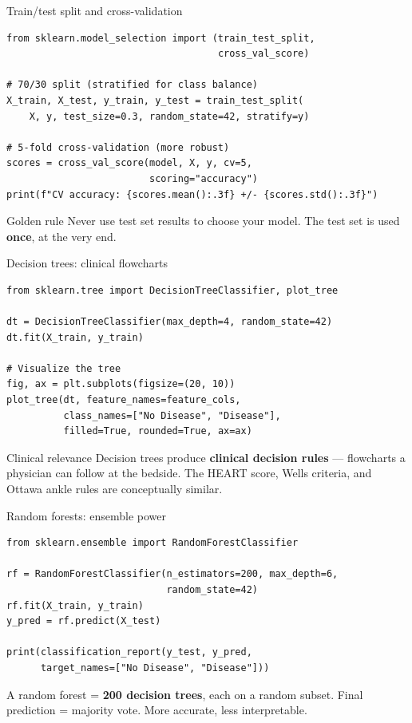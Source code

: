 \documentclass[aspectratio=169,11pt]{beamer}
\begin{document}
\begin{frame}[fragile]{Train/test split and cross-validation}
\begin{verbatim}
from sklearn.model_selection import (train_test_split,
                                     cross_val_score)

# 70/30 split (stratified for class balance)
X_train, X_test, y_train, y_test = train_test_split(
    X, y, test_size=0.3, random_state=42, stratify=y)

# 5-fold cross-validation (more robust)
scores = cross_val_score(model, X, y, cv=5,
                         scoring="accuracy")
print(f"CV accuracy: {scores.mean():.3f} +/- {scores.std():.3f}")
\end{verbatim}

\begin{alertblock}{Golden rule}
\alert{Never} use test set results to choose your model. The test set is used \textbf{once}, at the very end.
\end{alertblock}
\end{frame}

\begin{frame}[fragile]{Decision trees: clinical flowcharts}
\begin{verbatim}
from sklearn.tree import DecisionTreeClassifier, plot_tree

dt = DecisionTreeClassifier(max_depth=4, random_state=42)
dt.fit(X_train, y_train)

# Visualize the tree
fig, ax = plt.subplots(figsize=(20, 10))
plot_tree(dt, feature_names=feature_cols,
          class_names=["No Disease", "Disease"],
          filled=True, rounded=True, ax=ax)
\end{verbatim}

\begin{exampleblock}{Clinical relevance}
Decision trees produce \textbf{clinical decision rules} --- flowcharts a physician can follow at the bedside. The HEART score, Wells criteria, and Ottawa ankle rules are conceptually similar.
\end{exampleblock}
\end{frame}

\begin{frame}[fragile]{Random forests: ensemble power}
\begin{verbatim}
from sklearn.ensemble import RandomForestClassifier

rf = RandomForestClassifier(n_estimators=200, max_depth=6,
                            random_state=42)
rf.fit(X_train, y_train)
y_pred = rf.predict(X_test)

print(classification_report(y_test, y_pred,
      target_names=["No Disease", "Disease"]))
\end{verbatim}

\vspace{4pt}
A random forest = \textbf{200 decision trees}, each on a random subset. Final prediction = majority vote. More accurate, less interpretable.
\end{frame}
\end{document}
